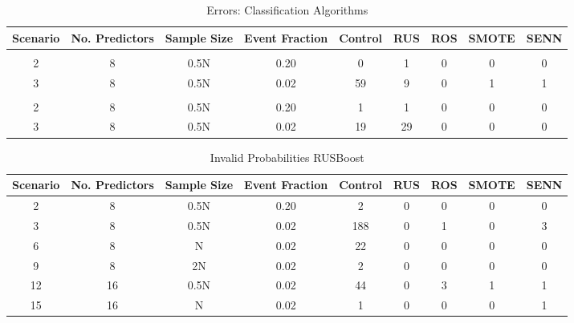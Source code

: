 \documentclass[
]{article}
\begin{document}
\begin{table}[!h]

\caption{\label{tab:tab:table}Errors: Classification Algorithms}
\centering
\begin{tabular}[t]{ccccccccc}
\toprule
Scenario & No. Predictors & Sample Size & Event Fraction & Control & RUS & ROS & SMOTE & SENN\\
\midrule
\addlinespace[0.3em]
\multicolumn{9}{l}{\textbf{RUSBoost:}}\\
\hspace{2em}\hspace{1em}2 & 8 & 0.5N & 0.20 & 0 & 1 & 0 & 0 & 0\\
 
\hspace{2em}\hspace{1em}3 & 8 & 0.5N & 0.02 & 59 & 9 & 0 & 1 & 1\\
 
\addlinespace[0.3em]
\multicolumn{9}{l}{\textbf{EasyEnsemble:}}\\
\hspace{2em}\hspace{1em}2 & 8 & 0.5N & 0.20 & 1 & 1 & 0 & 0 & 0\\
 
\hspace{2em}\hspace{1em}3 & 8 & 0.5N & 0.02 & 19 & 29 & 0 & 0 & 0\\
\bottomrule
\end{tabular}
\end{table}

\begin{table}[!h]

\caption{\label{tab:tab:invalid_ps}Invalid Probabilities RUSBoost}
\centering
\begin{tabular}[t]{ccccccccc}
\toprule
Scenario & No. Predictors & Sample Size & Event Fraction & Control & RUS & ROS & SMOTE & SENN\\
\midrule
2 & 8 & 0.5N & 0.20 & 2 & 0 & 0 & 0 & 0\\
 
3 & 8 & 0.5N & 0.02 & 188 & 0 & 1 & 0 & 3\\
 
6 & 8 & N & 0.02 & 22 & 0 & 0 & 0 & 0\\
 
9 & 8 & 2N & 0.02 & 2 & 0 & 0 & 0 & 0\\
 
12 & 16 & 0.5N & 0.02 & 44 & 0 & 3 & 1 & 1\\
 
15 & 16 & N & 0.02 & 1 & 0 & 0 & 0 & 1\\
\bottomrule
\end{tabular}
\end{table}
\end{document}

